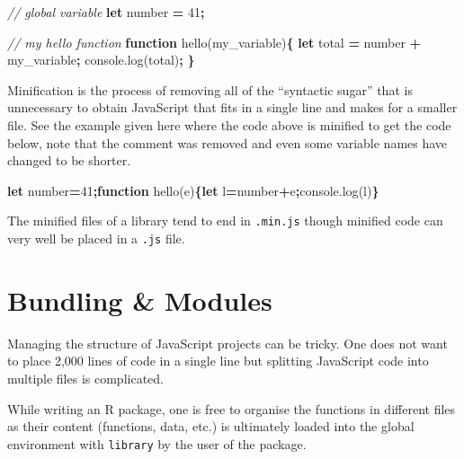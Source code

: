 \documentclass[10pt,]{krantz}
\makeatletter
\newenvironment{Shaded}{\begin{snugshade}}{\end{snugshade}}
\newcommand{\AttributeTok}[1]{\textcolor[rgb]{0.61,0.61,0.61}{#1}}
\newcommand{\CommentTok}[1]{\textcolor[rgb]{0.37,0.37,0.37}{\textit{#1}}}
\newcommand{\DecValTok}[1]{\textcolor[rgb]{0.06,0.06,0.06}{#1}}
\newcommand{\KeywordTok}[1]{\textcolor[rgb]{0.27,0.27,0.27}{\textbf{#1}}}
\newcommand{\NormalTok}[1]{#1}
\newcommand{\OperatorTok}[1]{\textcolor[rgb]{0.43,0.43,0.43}{\textbf{#1}}}
\newcommand{\VariableTok}[1]{\textcolor[rgb]{0,0,0}{#1}}
\newenvironment{kframe}{%
\medskip{}
\setlength{\fboxsep}{.8em}
 \def\at@end@of@kframe{}%
 \ifinner\ifhmode%
  \def\at@end@of@kframe{\end{minipage}}%
  \begin{minipage}{\columnwidth}%
 \fi\fi%
 \def\FrameCommand##1{\hskip\@totalleftmargin \hskip-\fboxsep
 \colorbox{shadecolor}{##1}\hskip-\fboxsep
     \hskip-\linewidth \hskip-\@totalleftmargin \hskip\columnwidth}%
 \MakeFramed {\advance\hsize-\width
   \@totalleftmargin\z@ \linewidth\hsize
   \@setminipage}}%
 {\par\unskip\endMakeFramed%
 \at@end@of@kframe}
\renewenvironment{Shaded}{\begin{kframe}}{\end{kframe}}
\makeatother
\begin{document}
\begin{Shaded}
\begin{Highlighting}[]
\CommentTok{// global variable}
\KeywordTok{let}\NormalTok{ number }\OperatorTok{=} \DecValTok{41}\OperatorTok{;}

\CommentTok{// my hello function}
\KeywordTok{function} \AttributeTok{hello}\NormalTok{(my_variable)}\OperatorTok{\{}
    \KeywordTok{let}\NormalTok{ total }\OperatorTok{=}\NormalTok{ number }\OperatorTok{+}\NormalTok{ my_variable}\OperatorTok{;}
    \VariableTok{console}\NormalTok{.}\AttributeTok{log}\NormalTok{(total)}\OperatorTok{;}
\OperatorTok{\}}
\end{Highlighting}
\end{Shaded}

Minification is the process of removing all of the ``syntactic sugar'' that is unnecessary to obtain JavaScript that fits in a single line and makes for a smaller file. See the example given here where the code above is minified to get the code below, note that the comment was removed and even some variable names have changed to be shorter.

\begin{Shaded}
\begin{Highlighting}[]
\KeywordTok{let}\NormalTok{ number}\OperatorTok{=}\DecValTok{41}\OperatorTok{;}\KeywordTok{function} \AttributeTok{hello}\NormalTok{(e)}\OperatorTok{\{}\KeywordTok{let}\NormalTok{ l}\OperatorTok{=}\NormalTok{number}\OperatorTok{+}\NormalTok{e}\OperatorTok{;}\VariableTok{console}\NormalTok{.}\AttributeTok{log}\NormalTok{(l)}\OperatorTok{\}}
\end{Highlighting}
\end{Shaded}

The minified files of a library tend to end in \texttt{.min.js} though minified code can very well be placed in a \texttt{.js} file.

\hypertarget{webpack-structure}{%
\section{Bundling \& Modules}\label{webpack-structure}}

Managing the structure of JavaScript projects can be tricky. One does not want to place 2,000 lines of code in a single line but splitting JavaScript code into multiple files is complicated.

While writing an R package, one is free to organise the functions in different files as their content (functions, data, etc.) is ultimately loaded into the global environment with \texttt{library} by the user of the package.
\end{document}
